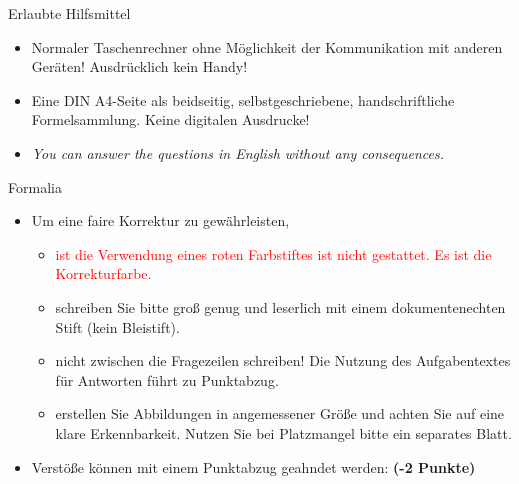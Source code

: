 \documentclass[a4paper, 9pt]{scrartcl}\usepackage[]{graphicx}\usepackage[]{xcolor}
\begin{document}
\maketitle
\thispagestyle{empty}
\clearpage

\begin{graybox}{Erlaubte Hilfsmittel}
  \vspace{1Ex}
  \begin{itemize}
  \item Normaler Taschenrechner ohne Möglichkeit der Kommunikation mit anderen
    Geräten! Ausdrücklich kein Handy!
  \item Eine DIN A4-Seite als beidseitig, selbstgeschriebene,
    handschriftliche Formelsammlung. Keine digitalen Ausdrucke! 
  \item \textit{You can answer the questions in English without any consequences.}  
  \end{itemize}
\end{graybox}
\vfill

\begin{graybox}{Formalia}
  \vspace{1Ex}
  \begin{itemize}
  \item Um eine faire Korrektur zu gewährleisten,
  \begin{itemize}
  \item \textcolor{red}{ist die Verwendung eines roten Farbstiftes ist nicht gestattet. Es ist die Korrekturfarbe.}
  \item schreiben Sie bitte groß genug und leserlich mit einem dokumentenechten Stift (kein Bleistift).
  \item nicht zwischen die Fragezeilen schreiben! Die Nutzung des Aufgabentextes für Antworten führt zu Punktabzug.
  \item erstellen Sie Abbildungen in angemessener Größe und achten Sie auf eine klare Erkennbarkeit. Nutzen Sie bei Platzmangel bitte ein separates Blatt.
  \end{itemize}
  \item Verstöße können mit einem Punktabzug geahndet werden:  \hfill \msquare\; \textbf{(-2 Punkte)}
  \end{itemize}
\end{graybox}
\vfill
\end{document}
